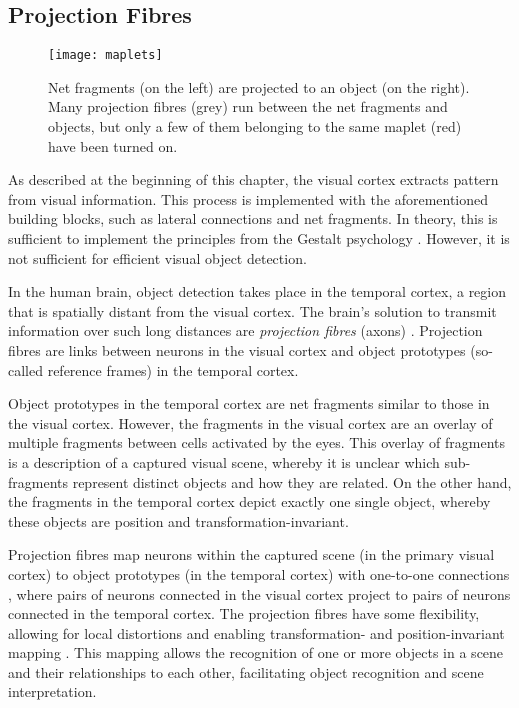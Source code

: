 \subsection{Projection Fibres}
\begin{figure}[h]
    \centering
    \texttt{[image: maplets]}
    \caption[An active maplet mapping net fragments to object prototypes]{Net fragments (on the left) are projected to an object (on the right). Many projection fibres (grey) run between the net fragments and objects, but only a few of them belonging to the same maplet (red) have been turned on.}
\end{figure}
%
As described at the beginning of this chapter, the visual cortex extracts pattern from visual information. This process is implemented with the aforementioned building blocks, such as lateral connections and net fragments. In theory, this is sufficient to implement the principles from the Gestalt psychology \cite{ellis_source_1938, kohler_gestalt_1992, wagemans_century_2012, hamlyn_psychology_2017}. However, it is not sufficient for efficient visual object detection.

In the human brain, object detection takes place in the temporal cortex, a region that is spatially distant from the visual cortex.
The brain's solution to transmit information over such long distances are \emph{projection fibres} (axons) .
Projection fibres are links between neurons in the visual cortex and object prototypes (so-called reference frames) in the temporal cortex.

Object prototypes in the temporal cortex are net fragments similar to those in the visual cortex. However, the fragments in the visual cortex are an overlay of multiple fragments between cells activated by the eyes.
This overlay of fragments is a description of a captured visual scene, whereby it is unclear which sub-fragments represent distinct objects and how they are related.
On the other hand, the fragments in the temporal cortex depict exactly one single object, whereby these objects are position and transformation-invariant.

Projection fibres map neurons within the captured scene (in the primary visual cortex) to object prototypes (in the temporal cortex) with one-to-one connections , where pairs of neurons connected in the visual cortex project to pairs of neurons connected in the temporal cortex. The projection fibres have some flexibility, allowing for local distortions and enabling transformation- and position-invariant mapping . This mapping allows the recognition of one or more objects in a scene and their relationships to each other, facilitating object recognition and scene interpretation.

